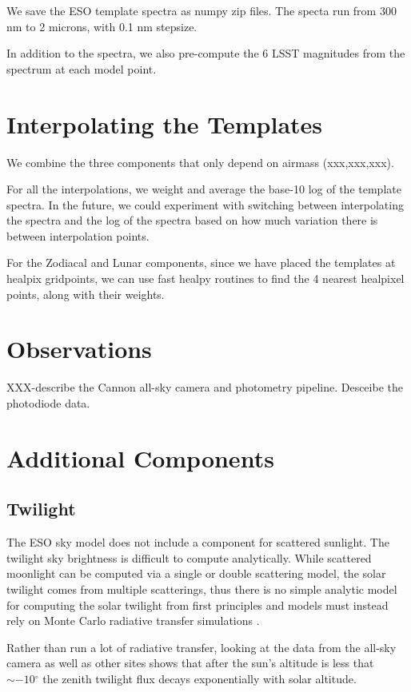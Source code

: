 \documentclass{emulateapj}  %
\newcommand\degree{{^\circ}}
\begin{document}
{We save the ESO template spectra as numpy zip files.  The specta run from 300 nm to 2 microns, with 0.1 nm stepsize.

In addition to the spectra, we also pre-compute the 6 LSST magnitudes from the spectrum at each model point.

\section{Interpolating the Templates}

We combine the three components that only depend on airmass (xxx,xxx,xxx).

For all the interpolations, we weight and average the base-10 log of the template spectra.  In the future, we could experiment with switching between interpolating the spectra and the log of the spectra based on how much variation there is between interpolation points.

For the Zodiacal and Lunar components, since we have placed the templates at healpix gridpoints, we can use fast healpy routines to find the 4 nearest healpixel points, along with their weights.  


\section{Observations}

XXX-describe the Cannon all-sky camera and photometry pipeline. Desceibe the photodiode data.  


\section{Additional Components}
\subsection{Twilight}

The ESO sky model does not include a component for scattered sunlight.  The twilight sky brightness is difficult to compute analytically.  While scattered moonlight can be computed via a single or double scattering model, the solar twilight comes from multiple scatterings, thus there is no simple analytic model for computing the solar twilight from first principles and models must instead rely on Monte Carlo radiative transfer simulations \citep{Patat06}.

Rather than run a lot of radiative transfer, looking at the data from the all-sky camera as well as other sites shows that after the sun's altitude is less that $\sim-10\degree$ the zenith twilight flux decays exponentially with solar altitude.

}
\end{document}
